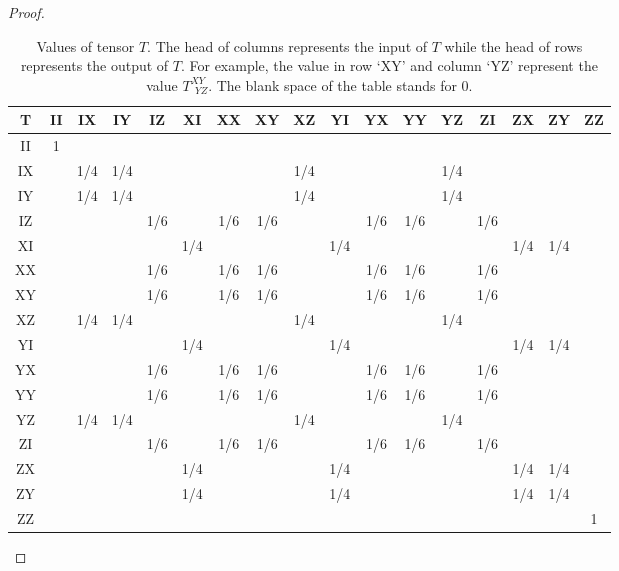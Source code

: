 \documentclass{article}
\begin{document}
\begin{proof}
\begin{table}
\centering
\begin{tabular}{|c|c|c|c|c|c|c|c|c|c|c|c|c|c|c|c|c|}
	\hline
	T  &II &IX &IY &IZ &XI &XX &XY &XZ &YI &YX &YY &YZ &ZI &ZX &ZY &ZZ \\ \hline
    II & 1 &   &   &   &   &   &   &   &   &   &   &   &   &   &   &   \\ \hline
    IX &   &1/4&1/4&   &   &   &   &1/4&   &   &   &1/4&   &   &   &   \\ \hline
    IY &   &1/4&1/4&   &   &   &   &1/4&   &   &   &1/4&   &   &   &   \\ \hline
    IZ &   &   &   &1/6&   &1/6&1/6&   &   &1/6&1/6&   &1/6&   &   &   \\ \hline
    XI &   &   &   &   &1/4&   &   &   &1/4&   &   &   &   &1/4&1/4&   \\ \hline
    XX &   &   &   &1/6&   &1/6&1/6&   &   &1/6&1/6&   &1/6&   &   &   \\ \hline
    XY &   &   &   &1/6&   &1/6&1/6&   &   &1/6&1/6&   &1/6&   &   &   \\ \hline
    XZ &   &1/4&1/4&   &   &   &   &1/4&   &   &   &1/4&   &   &   &   \\ \hline
    YI &   &   &   &   &1/4&   &   &   &1/4&   &   &   &   &1/4&1/4&   \\ \hline
    YX &   &   &   &1/6&   &1/6&1/6&   &   &1/6&1/6&   &1/6&   &   &   \\ \hline
    YY &   &   &   &1/6&   &1/6&1/6&   &   &1/6&1/6&   &1/6&   &   &   \\ \hline
    YZ &   &1/4&1/4&   &   &   &   &1/4&   &   &   &1/4&   &   &   &   \\ \hline
    ZI &   &   &   &1/6&   &1/6&1/6&   &   &1/6&1/6&   &1/6&   &   &   \\ \hline
    ZX &   &   &   &   &1/4&   &   &   &1/4&   &   &   &   &1/4&1/4&   \\ \hline
    ZY &   &   &   &   &1/4&   &   &   &1/4&   &   &   &   &1/4&1/4&   \\ \hline
    ZZ &   &   &   &   &   &   &   &   &   &   &   &   &   &   &   & 1 \\ \hline
\end{tabular}
\caption{Values of tensor $T$. The head of columns represents the input of $T$ while the head of rows represents the output of $T$. For example, the value in row `XY' and column `YZ' represent the value $T^{XY}_{~~YZ}$.  The blank space of the table stands for $0$.    }
\label{table: the 16x16 matrix of T}
\end{table}
\end{proof}
\end{document}
